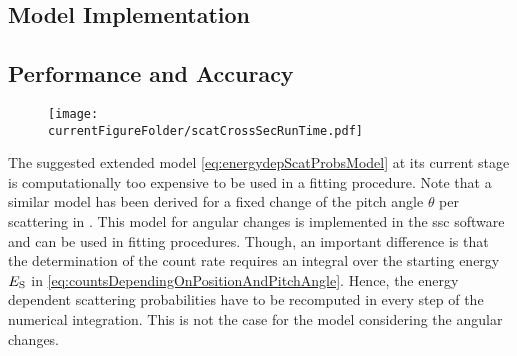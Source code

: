 \subsection{Model Implementation}
\todo{}
\subsection{Performance and Accuracy}
\begin{figure}[th]
    \centering
    \texttt{[image: \\currentFigureFolder/scatCrossSecRunTime.pdf]}
    \label{fig:scatCrossSecRunTimes}
\end{figure}
The suggested extended model \eqref{eq:energydepScatProbsModel} at its current stage is computationally too expensive to be used in a fitting procedure. Note that a similar model has been derived for a fixed change of the pitch angle $\theta$ per scattering in \cite{Groh2015}. This model for angular changes is implemented in the \gls{ssc} software and can be used in fitting procedures. Though, an important difference is that the determination of the count rate requires an integral over the starting energy $E_\mathrm{S}$ in \eqref{eq:countsDependingOnPositionAndPitchAngle}. Hence, the energy dependent scattering probabilities have to be recomputed in every step of the numerical integration. This is not the case for the model considering the angular changes.

